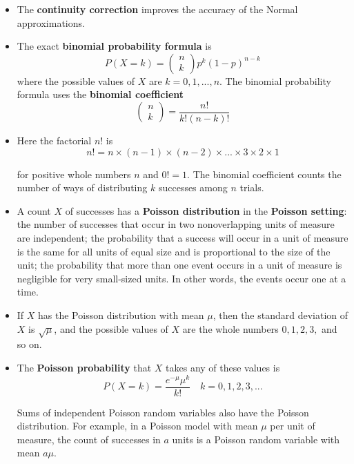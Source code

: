 \begin{itemize}
			\item The \textbf{continuity correction} improves the accuracy of the Normal approximations.
			
			\item The exact \textbf{binomial probability formula} is
			\[P(X=k)=\begin{pmatrix} n\\ k \end{pmatrix} p^k(1-p)^{n-k}\]
			where the possible values of $X$ are $k = 0,1,..., n$. The binomial probability formula uses the \textbf{binomial coefficient}
			\[\begin{pmatrix}n\\k\end{pmatrix}=\frac{n!}{k!(n-k)!}\]
						
			\item Here the factorial $n!$ is \[n!=n\times(n-1)\times(n-2)\times...\times3\times2\times1\]
			
			for positive whole numbers $n$ and $0! = 1$. The binomial coefficient counts the number of ways of distributing $k$ successes among $n$ trials.
			
			\item A count $X$ of successes has a \textbf{Poisson distribution} in the \textbf{Poisson setting}: the number of successes that occur in two nonoverlapping units of measure are independent; the probability that a success will occur in a unit of measure is the same for all units of equal size and is proportional to the size of the unit; the probability that more than one event occurs in a unit of measure is negligible for very small-sized units. In other words, the events occur one at a time.
			
			\item If $X$ has the Poisson distribution with mean $\mu$, then the standard deviation of $X$ is $\sqrt{\mu}$, and the possible values of $X$ are the whole numbers $0, 1, 2, 3,$ and so on.
			
			\item The \textbf{Poisson probability} that $X$ takes any of these values is
			\[P(X=k)=\frac{e^{-\mu}\mu^k}{k!}\quad k=0,1,2,3,...\]
			
			Sums of independent Poisson random variables also have the Poisson distribution. For example, in a Poisson model with mean $\mu$ per unit of measure, the count of successes in $a$ units is a Poisson random variable with mean $a\mu$.
		\end{itemize}
